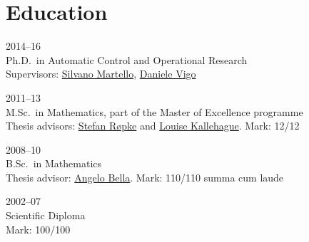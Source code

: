 \section*{Education}

\begin{paracol}{2}
  \textsc{2014--16}
\switchcolumn
  \\
  Ph.D.\ in Automatic Control and Operational Research\\
  Supervisors: \href{https://scholar.google.com/citations?user=o4a20zsAAAAJ}{Silvano Martello}, \href{https://scholar.google.com/citations?user=2kk8d_AAAAAJ}{Daniele Vigo}
\end{paracol}

\begin{paracol}{2}
  \textsc{2011--13}
\switchcolumn
  \\
  M.Sc.\ in Mathematics, part of the Master of Excellence programme\\
  Thesis advisors: \href{https://scholar.google.it/citations?user=sYi141QAAAAJ}{Stefan Røpke} and \href{http://orbit.dtu.dk/en/persons/louise-sibbesen-kallehauge(82eba7e1-4534-4eb7-adf0-c08d856235c5).html}{Louise Kallehague}. Mark: 12/12
\end{paracol}

\begin{paracol}{2}
  \textsc{2008--10}
\switchcolumn
  \\
  B.Sc.\ in Mathematics\\
  Thesis advisor: \href{http://ws1.unict.it/paginadocente/uploads/cit_c34b58e1bdd176c741004d830c9cf271.pdf}{Angelo Bella}. Mark: 110/110 summa cum laude
\end{paracol}

\begin{paracol}{2}
  \textsc{2002--07}
\switchcolumn
  \\
  Scientific Diploma\\
  Mark: 100/100
\end{paracol}

